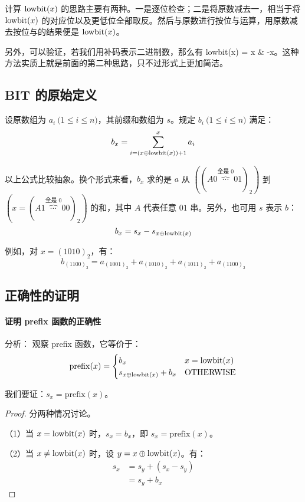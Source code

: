\documentclass[UTF8]{article}
\newcommand \code[1] {\colorbox[RGB]{245,245,245}{\Consolas #1}}
\begin{document}
	计算 $\mathrm{lowbit}(x)$ 的思路主要有两种。一是逐位检查；二是将原数减去一，相当于将 $\mathrm{lowbit}(x)$ 的对应位以及更低位全部取反。然后与原数进行按位与运算，用原数减去按位与的结果便是 $\mathrm{lowbit}(x)$。

	另外，可以验证，若我们用补码表示二进制数，那么有 \code{lowbit(x) = x \& -x}。这种方法实质上就是前面的第二种思路，只不过形式上更加简洁。

	\subsection{BIT 的原始定义}

	设原数组为 $a_i \pod {1 \le i \le n}$，其前缀和数组为 $s$。规定 $b_i \pod {1 \le i \le n}$ 满足：
	$$
	b_x = \sum_{i = \left(x \oplus \mathrm{lowbit}(x)\right) + 1}^{x} a_i
	$$

	\bigskip

	以上公式比较抽象。换个形式来看，$b_x$ 求的是 $a$ 从 $\left( (A 0 \overbrace{\cdots}^{\text{全是 }0} 01)_2 \right)$ 到 $\left( x = (A 1 \overbrace{\cdots}^{\text{全是 }0} 00)_2 \right)$ 的和，其中 $A$ 代表任意 $01$ 串。另外，也可用 $s$ 表示 $b$：
	$$
	b_x = s_x - s_{x \oplus \mathrm{lowbit}(x)}
	$$

	例如，对 $x = (1010)_2$，有：
	$$
	b_{(1100)_2} = a_{(1001)_2} + a_{(1010)_2} +
	a_{(1011)_2} + a_{(1100)_2}
	$$

	\subsection{正确性的证明}

	\newcommand \prefix {\mathrm{prefix}}
	\paragraph{证明 \code{prefix} 函数的正确性}

	分析：
	观察 \code{prefix} 函数，它等价于：
	$$
	\prefix(x) =
	\begin{cases}
		b_x & x = \lowbit(x)
		\\
		s_{x \oplus \lowbit(x)} + b_x & \text{OTHERWISE}
	\end{cases}
	$$

	我们要证：$s_x = \prefix(x)$。

	\begin{proof}

		分两种情况讨论。

		（1）当 $x = \mathrm{lowbit}(x)$ 时，$s_x = b_x$，即 $s_x = \prefix(x)$。

		（2）当 $x \ne \mathrm{lowbit}(x)$ 时，设 $y = x \oplus \mathrm{lowbit}(x)$。有：
		\begin{align*}
			s_x &= s_y + (s_x - s_y)
			\\&=
			s_y + b_x
		\end{align*}

	\end{proof}
\end{document}
